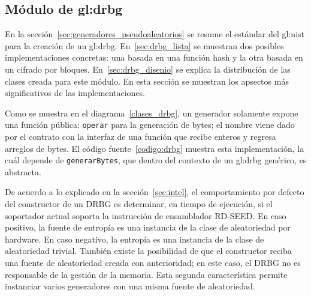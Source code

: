 %
%
%

\subsection{Módulo de \texorpdfstring{\acrshort{gl:drbg}}{DRBG}}
\label{sec:implementacion_drbg}

En la sección~\ref{sec:generadores_pseudoaleatorios} se resume el estándar del
\gls{gl:nist} para la  creación de un \gls{gl:drbg}. En~\ref{sec:drbg_lista} se
muestran dos posibles implementaciones concretas: una basada en una función
hash y la  otra basada en un cifrado por bloques. En~\ref{sec:drbg_disenio} se
explica la distribución de las clases creada para este módulo. En esta sección
se muestran los apsectos más significativos de las implementaciones.


Como se muestra en el diagrama~\ref{clases_drbg}, un generador solamente
expone una función pública: \texttt{operar} para la generación de bytes; el
nombre viene dado por el contrato con la interfaz de una función que
recibe enteros y regresa arreglos de bytes. El código fuente~\ref{codigo:drbg}
muestra esta implementación, la cuál depende de \texttt{generarBytes}, que
dentro del contexto de un \gls{gl:drbg} genérico, es abstracta.

De acuerdo a lo explicado en la sección~\ref{sec:intel}, el comportamiento por
defecto del constructor de un DRBG es determinar, en tiempo de ejecución, si el
soportador actual soporta la instrucción de ensamblador RD-SEED. En caso
positivo, la fuente de entropía es una instancia de la clase de aleatoriedad
por hardware. En caso negativo, la entropía es una instancia de la clase de
aleatoriedad trivial. También existe la posibilidad de que el constructor
reciba una fuente de aleatoriedad creada con anterioridad; en este caso, el
DRBG no es responsable de la gestión de la memoria. Esta segunda
característica permite instanciar varios generadores con una misma fuente de
aleatoriedad.



